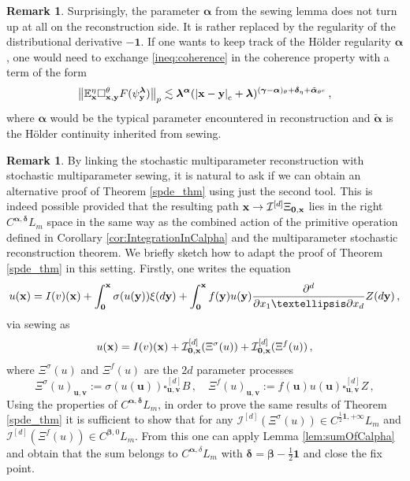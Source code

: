 \documentclass[12pt]{article}
\numberwithin{equation}{section}
\theoremstyle{plain}
\theoremstyle{definition}
\newtheorem{remark}[theorem]{Remark}
\newcommand{\compAbs}[1]{\left\vert#1\right\vert_{\text{c}}}
\newcommand{\norm}[1]{\left\Vert #1\right\Vert}
\def\bE{\mathbb{E}}\def\bW{\mathbb{W}}
\def\fu{\mathbf u}\def\fv{\mathbf v}
\def\fy{\mathbf y}\def\fz{\mathbf z}
\def\falpha{{\boldsymbol\alpha}}
\def\fbeta{{\boldsymbol\beta}}
\def\fgamma{{\boldsymbol\gamma}}
\def\fdelta{{\boldsymbol\delta}}
\def\flambda{{\boldsymbol\lambda}}
\def\foo{{\boldsymbol 0}}
\def\fone{{\boldsymbol 1}}
\begin{document}
\begin{remark}
    Surprisingly, the parameter $\falpha$ from the sewing lemma does not turn up at all on the reconstruction side. It is rather replaced by the regularity of the distributional derivative $-\fone$. If one wants to keep track of the H\"older regularity $\falpha$, one would need to exchange \eqref{ineq:coherence} in the coherence property with a term of the form
    \begin{equation*}
        \norm{\bE^\eta_\fx\square_{\fx,\fy}^\theta F(\psi_\fy^\flambda)}_p \lesssim \flambda^{\falpha}(\compAbs{\fx-\fy}+\flambda)^{(\fgamma-\falpha)_\theta+\fdelta_\eta+\tilde\falpha_{\theta^c}}\,,
    \end{equation*}
    where $\falpha$ would be the typical parameter encountered in reconstruction and $\tilde\falpha$ is the H\"older continuity inherited from sewing.
\end{remark}
\begin{remark}\label{rk_sew_fix_point}
By linking the stochastic multiparameter  reconstruction with stochastic multiparameter sewing, it is natural to ask if  we can obtain an alternative proof of Theorem  \eqref{spde_thm} using just the second tool. This is indeed possible provided that the resulting path $\fx\to \mathcal{I}^{[d]}\Xi_{\foo, \fx}$  lies in the right $C^{\falpha,\fdelta}L_m$ space in the same way as the combined action of the primitive operation defined in Corollary \ref{cor:IntegrationInCalpha} and the multiparameter stochastic reconstruction theorem. We briefly sketch how to adapt the proof of Theorem  \eqref{spde_thm} in this setting. Firstly, one writes the equation 
\[
   u(\fx) =  I(v)(\fx) + \int_{\foo}^{\fx} \sigma(u(\fy)) \xi(d\fy) + \int_\foo^\fx f(\fy)u(\fy)\frac{\partial^d }{\partial x_1\ldots \partial x_d}Z(d\fy) \,,
\]
via sewing as 
\[u(\fx) =  I(v)(\fx) + \mathcal{I}^{[d]}_{\foo,\fx}(\Xi^{\sigma}(u))+ \mathcal{I}^{[d]}_{\foo,\fx}(\Xi^{f}(u))\,,\]
where $\Xi^{\sigma}(u)$ and $\Xi^{f}(u)$ are the $2d$ parameter processes
\[\Xi^{\sigma}(u)_{\fu,\fv} := \sigma(u(\fu))\square_{\fu,\fv}^{[d]}B\,, \quad  \Xi^{f}(u)_{\fu,\fv} := f(\fu)u(\fu)\square_{\fu,\fv}^{[d]}Z\,, \]
Using the properties of $C^{\falpha,\fdelta}L_m$, in order to prove the same results of Theorem  \eqref{spde_thm} it is sufficient to show that for any $\mathcal{I}^{[d]}(\Xi^{\sigma}(u))\in C^{\frac{1}{2}\fone,+\infty}L_m$ and $\mathcal{I}^{[d]}(\Xi^{f}(u))\in C^{\fbeta,0}L_m$. From this one can apply Lemma  \ref{lem:sumOfCalpha} and obtain that the sum belongs to $C^{\falpha,\delta}L_m$ with $\fdelta= \fbeta-\frac{1}{2}\fone$ and close the fix point.
\end{remark}
\end{document}

